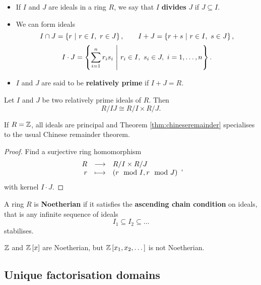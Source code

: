 \pagebreak

\begin{definition}
\hfill
\begin{itemize}
\item If $ I $ and $ J $ are ideals in a ring $ R $, we say that $ I $ \textbf{divides} $ J $ if $ J \subseteq I $.
\item We can form ideals
$$ I \cap J = \cbr{r \st r \in I, \ r \in J}, \qquad I + J = \cbr{r + s \st r \in I, \ s \in J}, $$
$$ I \cdot J = \cbr{\sum_{i = 1}^n r_is_i \st r_i \in I, \ s_i \in J, \ i = 1, \dots, n}. $$
\item $ I $ and $ J $ are said to be \textbf{relatively prime} if $ I + J = R $.
\end{itemize}
\end{definition}

\begin{theorem}
\label{thm:chineseremainder}
Let $ I $ and $ J $ be two relatively prime ideals of $ R $. Then
$$ R / IJ \cong R / I \times R / J. $$
\end{theorem}

\begin{remark*}
If $ R = \mathbb{Z} $, all ideals are principal and Theorem \ref{thm:chineseremainder} specialises to the usual Chinese remainder theorem.
\end{remark*}

\begin{proof}
Find a surjective ring homomorphism
$$ \function{R}{R / I \times R / J}{r}{\br{r \mod I, r \mod J}}, $$
with kernel $ I \cdot J $.
\end{proof}

\begin{definition}
A ring $ R $ is \textbf{Noetherian} if it satisfies the \textbf{ascending chain condition} on ideals, that is any infinite sequence of ideals
$$ I_1 \subseteq I_2 \subseteq \dots $$
stabilises.
\end{definition}

\begin{example*}
$ \mathbb{Z} $ and $ \ZZ\sbr{x} $ are Noetherian, but $ \ZZ\sbr{x_1, x_2, \dots} $ is not Noetherian.
\end{example*}

\subsection{Unique factorisation domains}


